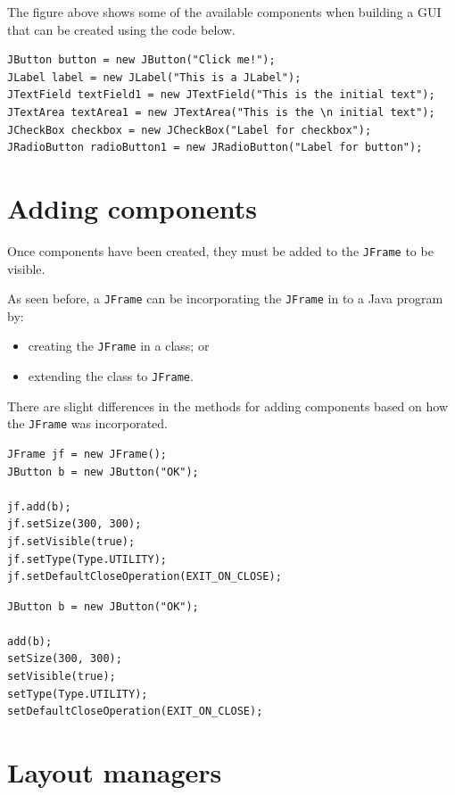 \documentclass[a4paper]{systems-software}
\begin{document}
The figure above shows some of the available components when building a GUI that can be created using the code below.

\begin{lstlisting}[title={Creating components}]
JButton button = new JButton("Click me!");
JLabel label = new JLabel("This is a JLabel");
JTextField textField1 = new JTextField("This is the initial text");
JTextArea textArea1 = new JTextArea("This is the \n initial text");
JCheckBox checkbox = new JCheckBox("Label for checkbox");
JRadioButton radioButton1 = new JRadioButton("Label for button");
\end{lstlisting}


\section*{Adding components}

Once components have been created, they must be added to the \texttt{JFrame} to be visible.

As seen before, a \texttt{JFrame} can be incorporating the \texttt{JFrame} in to a Java program by:
\begin{itemize}
	\item creating the \texttt{JFrame} in a class; or
	\item extending the class to \texttt{JFrame}.
\end{itemize}

There are slight differences in the methods for adding components based on how the \texttt{JFrame} was incorporated.

\newpage

\begin{lstlisting}[title={Adding a button component in a class where the JFrame was created.}]
JFrame jf = new JFrame();
JButton b = new JButton("OK");

jf.add(b);
jf.setSize(300, 300);
jf.setVisible(true);
jf.setType(Type.UTILITY);
jf.setDefaultCloseOperation(EXIT_ON_CLOSE);
\end{lstlisting}

\begin{lstlisting}[title={Adding a button component in a class that extends from JFrame.}]
JButton b = new JButton("OK");

add(b);
setSize(300, 300);
setVisible(true);
setType(Type.UTILITY);
setDefaultCloseOperation(EXIT_ON_CLOSE);
\end{lstlisting}


\section{Layout managers}
\end{document}
